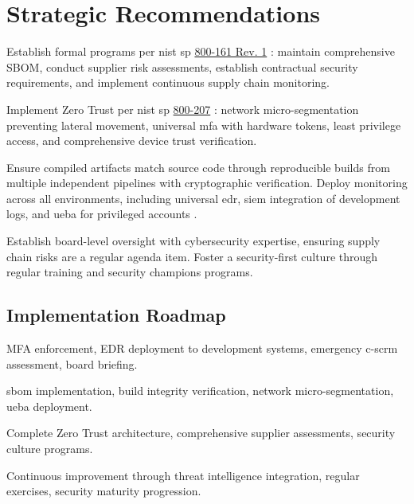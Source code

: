\section{Strategic Recommendations}
\label{sec:recommendations}

 Establish formal programs per \gls{nist} \gls{sp} \href{https://csrc.nist.gov/pubs/sp/800/161/r1/upd1/final}{800-161 Rev. 1} \cite{boyens_cybersecurity_2022, group_securing_2022}: maintain comprehensive SBOM, conduct supplier risk assessments, establish contractual security requirements, and implement continuous supply chain monitoring.

 Implement Zero Trust per \gls{nist} \gls{sp} \href{https://csrc.nist.gov/pubs/sp/800/207/final}{800-207} \cite{rose_zero_2020}: network micro-segmentation preventing lateral movement, universal \gls{mfa} with hardware tokens, least privilege access, and comprehensive device trust verification.

 Ensure compiled artifacts match source code through reproducible builds from multiple independent pipelines with cryptographic verification. Deploy monitoring across all environments, including universal \gls{edr}, \gls{siem} integration of development logs, and \gls{ueba} for privileged accounts \cite{litan_market_2015}.

 Establish board-level oversight with cybersecurity expertise, ensuring supply chain risks are a regular agenda item. Foster a security-first culture through regular training and security champions programs.

\subsection{Implementation Roadmap}

 MFA enforcement, EDR deployment to development systems, emergency \gls{c-scrm} assessment, board briefing.

 \gls{sbom} implementation, build integrity verification, network micro-segmentation, \gls{ueba} deployment.

 Complete Zero Trust architecture, comprehensive supplier assessments, security culture programs.

 Continuous improvement through threat intelligence integration, regular exercises, security maturity progression.
